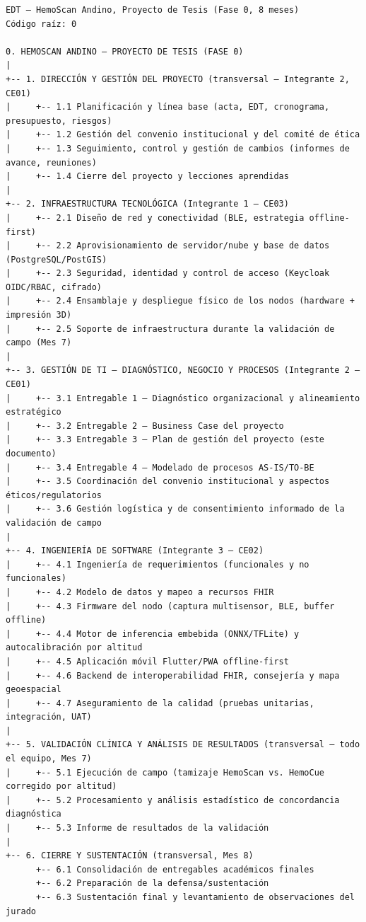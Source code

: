 \documentclass[11pt,a4paper]{article}
\begin{document}
\begin{samepage}\begin{verbatim}
EDT — HemoScan Andino, Proyecto de Tesis (Fase 0, 8 meses)
Código raíz: 0

0. HEMOSCAN ANDINO — PROYECTO DE TESIS (FASE 0)
|
+-- 1. DIRECCIÓN Y GESTIÓN DEL PROYECTO (transversal — Integrante 2, CE01)
|     +-- 1.1 Planificación y línea base (acta, EDT, cronograma, presupuesto, riesgos)
|     +-- 1.2 Gestión del convenio institucional y del comité de ética
|     +-- 1.3 Seguimiento, control y gestión de cambios (informes de avance, reuniones)
|     +-- 1.4 Cierre del proyecto y lecciones aprendidas
|
+-- 2. INFRAESTRUCTURA TECNOLÓGICA (Integrante 1 — CE03)
|     +-- 2.1 Diseño de red y conectividad (BLE, estrategia offline-first)
|     +-- 2.2 Aprovisionamiento de servidor/nube y base de datos (PostgreSQL/PostGIS)
|     +-- 2.3 Seguridad, identidad y control de acceso (Keycloak OIDC/RBAC, cifrado)
|     +-- 2.4 Ensamblaje y despliegue físico de los nodos (hardware + impresión 3D)
|     +-- 2.5 Soporte de infraestructura durante la validación de campo (Mes 7)
|
+-- 3. GESTIÓN DE TI — DIAGNÓSTICO, NEGOCIO Y PROCESOS (Integrante 2 — CE01)
|     +-- 3.1 Entregable 1 — Diagnóstico organizacional y alineamiento estratégico
|     +-- 3.2 Entregable 2 — Business Case del proyecto
|     +-- 3.3 Entregable 3 — Plan de gestión del proyecto (este documento)
|     +-- 3.4 Entregable 4 — Modelado de procesos AS-IS/TO-BE
|     +-- 3.5 Coordinación del convenio institucional y aspectos éticos/regulatorios
|     +-- 3.6 Gestión logística y de consentimiento informado de la validación de campo
|
+-- 4. INGENIERÍA DE SOFTWARE (Integrante 3 — CE02)
|     +-- 4.1 Ingeniería de requerimientos (funcionales y no funcionales)
|     +-- 4.2 Modelo de datos y mapeo a recursos FHIR
|     +-- 4.3 Firmware del nodo (captura multisensor, BLE, buffer offline)
|     +-- 4.4 Motor de inferencia embebida (ONNX/TFLite) y autocalibración por altitud
|     +-- 4.5 Aplicación móvil Flutter/PWA offline-first
|     +-- 4.6 Backend de interoperabilidad FHIR, consejería y mapa geoespacial
|     +-- 4.7 Aseguramiento de la calidad (pruebas unitarias, integración, UAT)
|
+-- 5. VALIDACIÓN CLÍNICA Y ANÁLISIS DE RESULTADOS (transversal — todo el equipo, Mes 7)
|     +-- 5.1 Ejecución de campo (tamizaje HemoScan vs. HemoCue corregido por altitud)
|     +-- 5.2 Procesamiento y análisis estadístico de concordancia diagnóstica
|     +-- 5.3 Informe de resultados de la validación
|
+-- 6. CIERRE Y SUSTENTACIÓN (transversal, Mes 8)
      +-- 6.1 Consolidación de entregables académicos finales
      +-- 6.2 Preparación de la defensa/sustentación
      +-- 6.3 Sustentación final y levantamiento de observaciones del jurado
\end{verbatim}\end{samepage}
\end{document}
